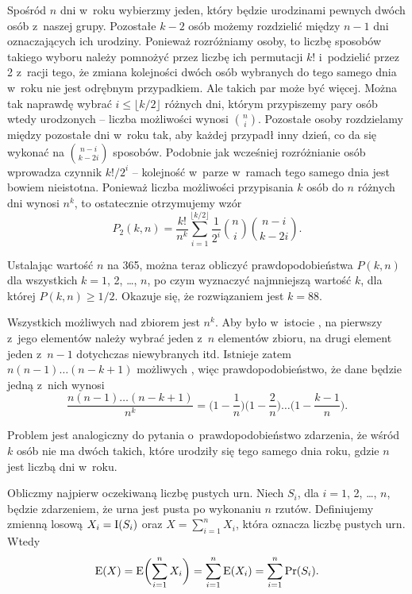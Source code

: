 Spośród $n$ dni w~roku wybierzmy jeden, który będzie urodzinami pewnych dwóch osób z~naszej grupy.
Pozostałe $k-2$ osób możemy rozdzielić między $n-1$ dni oznaczających ich urodziny.
Ponieważ rozróżniamy osoby, to liczbę sposobów takiego wyboru należy pomnożyć przez liczbę ich permutacji $k!$ i~podzielić przez 2 z~racji tego, że zmiana kolejności dwóch osób wybranych do tego samego dnia w~roku nie jest odrębnym przypadkiem.
Ale takich par może być więcej.
Można tak naprawdę wybrać $i\le\lfloor k/2\rfloor$ różnych dni, którym przypiszemy pary osób wtedy urodzonych -- liczba możliwości wynosi $\binom{n}{i}$.
Pozostałe osoby rozdzielamy między pozostałe dni w~roku tak, aby każdej przypadł inny dzień, co da się wykonać na $\binom{n-i}{k-2i}$ sposobów.
Podobnie jak wcześniej rozróżnianie osób wprowadza czynnik $k!/2^i$ -- kolejność w~parze w~ramach tego samego dnia jest bowiem nieistotna.
Ponieważ liczba możliwości przypisania $k$ osób do $n$ różnych dni wynosi $n^k$, to ostatecznie otrzymujemy wzór
\[
	P_2(k,n) = \frac{k!}{n^k}\sum_{i=1}^{\lfloor k/2\rfloor}\frac{1}{2^i}\binom{n}{i}\binom{n-i}{k-2i}.
\]

Ustalając wartość $n$ na 365, można teraz obliczyć prawdopodobieństwa $P(k,n)$ dla wszystkich $k=1$, 2, \dots, $n$, po czym wyznaczyć najmniejszą wartość $k$, dla której $P(k,n)\ge1/2$.
Okazuje się, że rozwiązaniem jest $k=88$.

\exercise %
Wszystkich możliwych  nad zbiorem  jest $n^k$.
Aby  było w~istocie , na pierwszy z~jego elementów należy wybrać jeden z~$n$ elementów zbioru, na drugi element jeden z~$n-1$ dotychczas niewybranych itd.
Istnieje zatem $n(n-1)\dots(n-k+1)$ możliwych , więc prawdopodobieństwo, że dane  będzie jedną z~nich wynosi
\[
	\frac{n(n-1)\dots(n-k+1)}{n^k} = \biggl(1-\frac{1}{n}\biggr)\biggl(1-\frac{2}{n}\biggr)\dots\biggl(1-\frac{k-1}{n}\biggr).
\]

Problem jest analogiczny do pytania o~prawdopodobieństwo zdarzenia, że wśród $k$ osób nie ma dwóch takich, które urodziły się tego samego dnia roku, gdzie $n$ jest liczbą dni w~roku.

\exercise %
Obliczmy najpierw oczekiwaną liczbę pustych urn.
Niech $S_i$, dla $i=1$, 2, \dots, $n$, będzie zdarzeniem, że  urna jest pusta po wykonaniu $n$ rzutów.
Definiujemy zmienną losową $X_i=\operatorname{I}(S_i)$ oraz $X=\sum_{i=1}^nX_i$, która oznacza liczbę pustych urn.
Wtedy
\[
	\operatorname{E}(X) = \operatorname{E}\biggl(\sum_{i=1}^nX_i\biggr) = \sum_{i=1}^n\operatorname{E}(X_i) = \sum_{i=1}^n\Pr(S_i).
\]

